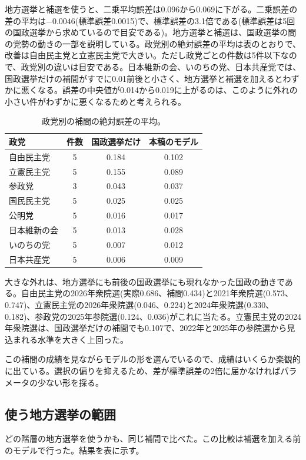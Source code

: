 \documentclass[a4paper,11pt]{ltjsarticle}
\begin{document}
地方選挙と補選を使うと、二乗平均誤差は0.096から0.069に下がる。二乗誤差の差の平均は$-0.0046$(標準誤差0.0015)で、標準誤差の3.1倍である(標準誤差は5回の国政選挙から求めているので目安である)。地方選挙と補選は、国政選挙の間の党勢の動きの一部を説明している。政党別の絶対誤差の平均は表のとおりで、改善は自由民主党と立憲民主党で大きい。ただし政党ごとの件数は5件以下なので、政党別の違いは目安である。日本維新の会、いのちの党、日本共産党では、国政選挙だけの補間がすでに0.01前後と小さく、地方選挙と補選を加えるとわずかに悪くなる。誤差の中央値が0.014から0.019に上がるのは、このように外れの小さい件がわずかに悪くなるためと考えられる。

\begin{table}[h]
\centering
\begin{tabular}{lccc}
\hline
政党 & 件数 & 国政選挙だけ & 本稿のモデル \\
\hline
自由民主党 & 5 & 0.184 & 0.102 \\
立憲民主党 & 5 & 0.155 & 0.089 \\
参政党 & 3 & 0.043 & 0.037 \\
国民民主党 & 5 & 0.025 & 0.025 \\
公明党 & 5 & 0.016 & 0.017 \\
日本維新の会 & 5 & 0.013 & 0.028 \\
いのちの党 & 5 & 0.007 & 0.012 \\
日本共産党 & 5 & 0.006 & 0.009 \\
\hline
\end{tabular}
\caption{政党別の補間の絶対誤差の平均。}
\end{table}

大きな外れは、地方選挙にも前後の国政選挙にも現れなかった国政の動きである。自由民主党の2026年衆院選(実際0.686、補間0.434)と2021年衆院選(0.573、0.747)、立憲民主党の2026年衆院選(0.046、0.224)と2024年衆院選(0.330、0.182)、参政党の2025年参院選(0.124、0.036)がこれに当たる。立憲民主党の2024年衆院選は、国政選挙だけの補間でも0.107で、2022年と2025年の参院選から見込まれる水準を大きく上回った。

この補間の成績を見ながらモデルの形を選んでいるので、成績はいくらか楽観的に出ている。選択の偏りを抑えるため、差が標準誤差の2倍に届かなければパラメータの少ない形を採る。

\subsection{使う地方選挙の範囲}
\label{sec:levels}

どの階層の地方選挙を使うかも、同じ補間で比べた。この比較は補選を加える前のモデルで行った。結果を表に示す。
\end{document}
